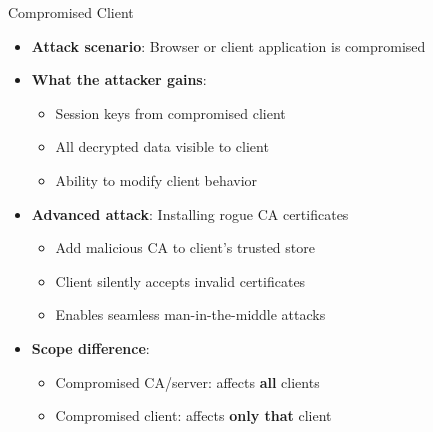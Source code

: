 \documentclass[aspectratio=169, lualatex, handout]{beamer}
\begin{document}
\begin{frame}{Compromised Client}
	\begin{itemize}[<+->]
		\item \textbf{Attack scenario}: Browser or client application is compromised
		\item \textbf{What the attacker gains}:
		      \begin{itemize}
			      \item Session keys from compromised client
			      \item All decrypted data visible to client
			      \item Ability to modify client behavior
		      \end{itemize}
		\item \textbf{Advanced attack}: Installing rogue CA certificates
		      \begin{itemize}
			      \item Add malicious CA to client's trusted store
			      \item Client silently accepts invalid certificates
			      \item Enables seamless man-in-the-middle attacks
		      \end{itemize}
		\item \textbf{Scope difference}:
		      \begin{itemize}
			      \item Compromised CA/server: affects \textbf{all} clients
			      \item Compromised client: affects \textbf{only that} client
		      \end{itemize}
	\end{itemize}
\end{frame}
\end{document}
